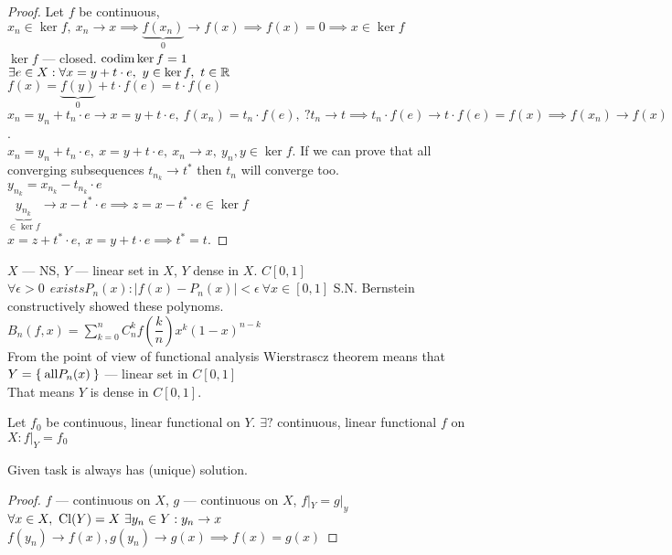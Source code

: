 \begin{proof}
  Let $f$ be continuous, $x_n \in \ker{f},\ x_n \to x \implies
  \underbrace{f(x_n)}_0 \to f(x) \implies f(x) = 0 \implies x \in \ker{f}$ \\
  $\ker{f}$ --- closed. $\operatorname{codim}{\ker{f}} = 1$ \\
  $\exists e \in X : \forall x = y + t \cdot e,\ y \in \ker{f},\ t \in \R$
  \\
  $f(x) = \underbrace{f(y)}_0 + t \cdot f(e) = t \cdot f(e)$ \\
  $x_n = y_n + t_n \cdot e \to x = y + t \cdot e,\ f(x_n) = t_n \cdot f(e),\
  ?t_n \to t \implies t_n \cdot f(e) \to t \cdot f(e) = f(x) \implies f(x_n) \to
  f(x)$. \\
  $x_n = y_n + t_n \cdot e,\ x = y + t \cdot e,\ x_n \to x,\ y_n,y \in \ker{f}$.
  If we can prove that all converging subsequences $t_{n_k} \to t^*$ then $t_n$ will
  converge too. \\
  $y_{n_k} = x_{n_k} - t_{n_k} \cdot e$ \\
  $\underbrace{y_{n_k}}_{\in \ker{f}} \to x - t^* \cdot e \implies z = x - t^*
  \cdot e \in \ker{f}$ \\
  $x = z + t^* \cdot e,\ x = y + t \cdot e \implies t^* = t$.
\end{proof}

\noindent
$X$ --- NS, $Y$ --- linear set in $X$, $Y$ dense in $X$.
$C[0, 1]$ \\
$\forall \epsilon > 0\ \ exists P_n(x) : |f(x) - P_n(x)| < \epsilon\ \forall x \in [0, 1]$ 
S.N. Bernstein constructively showed these polynoms. \\
$B_n(f, x) = \sum\limits_{k = 0}^n C_n^k f(\dfrac{k}{n}) x^k (1 - x)^{n - k}$ \\
From the point of view of functional analysis Wierstrascz theorem means that 
$Y = \Set{\text{all} P_n(x)}$ --- linear set in $C[0, 1]$ \\
That means $Y$ is dense in $C[0, 1]$.

\begin{note}
  Let $f_0$ be continuous, linear functional on $Y$. $\exists ?$ continuous,
  linear functional $f$ on $X : f|_Y = f_0$
\end{note}

\begin{thm}
  Given task is always has (unique) solution.
\end{thm}

\begin{proof}
  $f$ --- continuous on $X$, $g$ --- continuous on $X$, $f|_Y = g|_y$ \\
  $\forall x \in X,\ \operatorname{Cl}({Y}) = X\ \exists y_n \in Y : y_n \to x$ \\
  $f(y_n) \to f(x), g(y_n) \to g(x) \implies f(x) = g(x)$
\end{proof}

